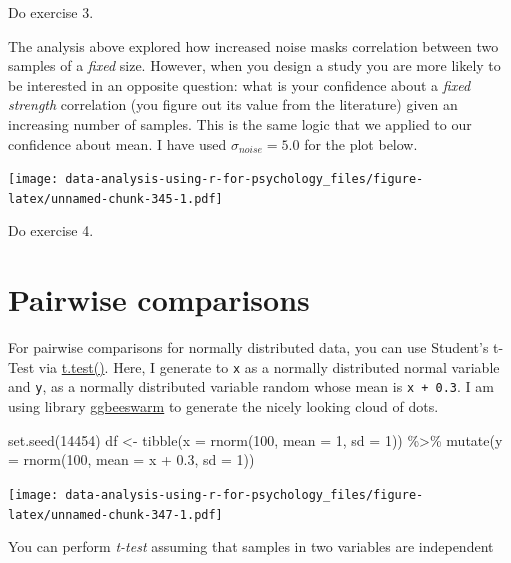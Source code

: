 \documentclass[
]{book}
\newenvironment{Shaded}{\begin{snugshade}}{\end{snugshade}}
\newcommand{\AttributeTok}[1]{\textcolor[rgb]{0.77,0.63,0.00}{#1}}
\newcommand{\DecValTok}[1]{\textcolor[rgb]{0.00,0.00,0.81}{#1}}
\newcommand{\FloatTok}[1]{\textcolor[rgb]{0.00,0.00,0.81}{#1}}
\newcommand{\FunctionTok}[1]{\textcolor[rgb]{0.00,0.00,0.00}{#1}}
\newcommand{\NormalTok}[1]{#1}
\newcommand{\OtherTok}[1]{\textcolor[rgb]{0.56,0.35,0.01}{#1}}
\newcommand{\SpecialCharTok}[1]{\textcolor[rgb]{0.00,0.00,0.00}{#1}}
\begin{document}
Do exercise 3.

The analysis above explored how increased noise masks correlation between two samples of a \emph{fixed} size. However, when you design a study you are more likely to be interested in an opposite question: what is your confidence about a \emph{fixed strength} correlation (you figure out its value from the literature) given an increasing number of samples. This is the same logic that we applied to our confidence about mean. I have used \(\sigma_{noise} = 5.0\) for the plot below.

\texttt{[image: data-analysis-using-r-for-psychology\_files/figure-latex/unnamed-chunk-345-1.pdf]}

Do exercise 4.

\hypertarget{pairwise-comparisons}{%
\section{Pairwise comparisons}\label{pairwise-comparisons}}

For pairwise comparisons for normally distributed data, you can use Student's t-Test via \href{https://stat.ethz.ch/R-manual/R-devel/library/stats/html/t.test.html}{t.test()}. Here, I generate to \texttt{x} as a normally distributed normal variable and \texttt{y}, as a normally distributed variable random whose mean is \texttt{x\ +\ 0.3}. I am using library \href{https://github.com/eclarke/ggbeeswarm}{ggbeeswarm} to generate the nicely looking cloud of dots.

\begin{Shaded}
\begin{Highlighting}[]
\FunctionTok{set.seed}\NormalTok{(}\DecValTok{14454}\NormalTok{)}
\NormalTok{df }\OtherTok{\textless{}{-}} 
  \FunctionTok{tibble}\NormalTok{(}\AttributeTok{x =} \FunctionTok{rnorm}\NormalTok{(}\DecValTok{100}\NormalTok{, }\AttributeTok{mean =} \DecValTok{1}\NormalTok{, }\AttributeTok{sd =} \DecValTok{1}\NormalTok{)) }\SpecialCharTok{\%\textgreater{}\%}
  \FunctionTok{mutate}\NormalTok{(}\AttributeTok{y =} \FunctionTok{rnorm}\NormalTok{(}\DecValTok{100}\NormalTok{, }\AttributeTok{mean =}\NormalTok{ x }\SpecialCharTok{+} \FloatTok{0.3}\NormalTok{, }\AttributeTok{sd =} \DecValTok{1}\NormalTok{))}
\end{Highlighting}
\end{Shaded}

\texttt{[image: data-analysis-using-r-for-psychology\_files/figure-latex/unnamed-chunk-347-1.pdf]}

You can perform \emph{t-test} assuming that samples in two variables are independent
\end{document}
